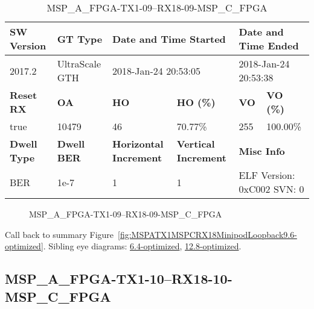 \begin{table}[h]
\centering
\caption{MSP\_A\_FPGA-TX1-09--RX18-09-MSP\_C\_FPGA}
\label{tab:MSPAFPGATX109RX1809MSPCFPGA9.6-optimized}
\begin{tabular}{@{}|l|l|l|l|l|l|@{}}
\toprule
\textbf{SW Version}                & \textbf{GT Type}   & \multicolumn{2}{l|}{\textbf{Date and Time Started}}            & \multicolumn{2}{l|}{\textbf{Date and Time Ended}}        \\ \midrule
2017.2                       & UltraScale GTH          & \multicolumn{2}{l|}{2018-Jan-24 20:53:05}                   & \multicolumn{2}{l|}{2018-Jan-24 20:53:38}               \\ \midrule
\textbf{Reset RX}                  & \textbf{OA} & \textbf{HO}   & \textbf{HO (\%)} & \textbf{VO} & \textbf{VO (\%)} \\ \midrule
true & 10479        & 46          & 70.77\%        & 255        & 100.00\%       \\ \midrule
\textbf{Dwell Type}                & \textbf{Dwell BER} & \textbf{Horizontal Increment} & \textbf{Vertical Increment}    & \multicolumn{2}{l|}{\textbf{Misc Info}}                  \\ \midrule
BER                            & 1e-7        & 1        & 1           & \multicolumn{2}{l|}{ELF Version: 0xC002 SVN: 0}                         \\ \bottomrule
\end{tabular}
\end{table}

\begin{figure}[h]
\caption{MSP\_A\_FPGA-TX1-09--RX18-09-MSP\_C\_FPGA} \label{fig:MSPAFPGATX109RX1809MSPCFPGA9.6-optimized}
\end{figure}

Call back to summary Figure~\ref{fig:MSPATX1MSPCRX18MinipodLoopback9.6-optimized}.
Sibling eye diagrams: \hyperref[sec:MSPAFPGATX109RX1809MSPCFPGA6.4-optimized]{6.4-optimized}, \hyperref[sec:MSPAFPGATX109RX1809MSPCFPGA12.8-optimized]{12.8-optimized}.

\clearpage
\newpage


\subsection{MSP\_A\_FPGA-TX1-10--RX18-10-MSP\_C\_FPGA}\label{sec:MSPAFPGATX110RX1810MSPCFPGA9.6-optimized}

